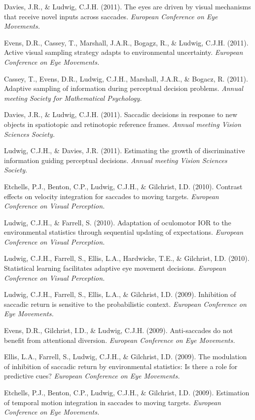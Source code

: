 \documentclass[a4paper, 10pt]{article}
\renewenvironment{itemize}{
  \begin{list}{}{
    \setlength{\leftmargin}{1.5em}
  }
}{
  \end{list}
}
\begin{document}
\begin{itemize}
\item Davies, J.R., \& Ludwig, C.J.H. (2011). The eyes are driven by visual mechanisms that receive novel inputs across saccades. {\it European Conference on Eye Movements.}
\item Evens, D.R., Cassey, T., Marshall, J.A.R., Bogagz, R., \& Ludwig, C.J.H. (2011). Active visual sampling strategy adapts to environmental uncertainty. {\it European Conference on Eye Movements.}
\item Cassey, T., Evens, D.R., Ludwig, C.J.H., Marshall, J.A.R., \& Bogacz, R. (2011). Adaptive sampling of information during perceptual decision problems. {\it Annual meeting Society for Mathematical Psychology.}
\item Davies, J.R., \& Ludwig, C.J.H. (2011). Saccadic decisions in response to new objects in spatiotopic and retinotopic reference frames. {\it Annual meeting Vision Sciences Society.}
\item Ludwig, C.J.H., \& Davies, J.R. (2011). Estimating the growth of discriminative information guiding perceptual decisions. {\it Annual meeting Vision Sciences Society.}
\item Etchells, P.J., Benton, C.P., Ludwig, C.J.H., \& Gilchrist, I.D. (2010). Contrast effects on velocity integration for saccades to moving targets. {\it European Conference on Visual Perception.}
\item Ludwig, C.J.H., \& Farrell, S. (2010). Adaptation of oculomotor IOR to the environmental statistics through sequential updating of expectations. {\it European Conference on Visual Perception.}
\item Ludwig, C.J.H., Farrell, S., Ellis, L.A., Hardwicke, T.E., \& Gilchrist, I.D. (2010). Statistical learning facilitates adaptive eye movement decisions. {\it European Conference on Visual Perception.}
\item Ludwig, C.J.H., Farrell, S., Ellis, L.A., \& Gilchrist, I.D. (2009). Inhibition of saccadic return is sensitive to the probabilistic context. {\it European Conference on Eye Movements.}
\item Evens, D.R., Gilchrist, I.D., \& Ludwig, C.J.H. (2009). Anti-saccades do not benefit from attentional diversion. {\it European Conference on Eye Movements.}
\item Ellis, L.A., Farrell, S., Ludwig, C.J.H., \& Gilchrist, I.D. (2009). The modulation of inhibition of saccadic return by environmental statistics: Is there a role for predictive cues? {\it European Conference on Eye Movements.}
\item Etchells, P.J., Benton, C.P., Ludwig, C.J.H., \& Gilchrist, I.D. (2009). Estimation of temporal motion integration in saccades to moving targets. {\it European Conference on Eye Movements.}

\end{itemize}
\end{document}
